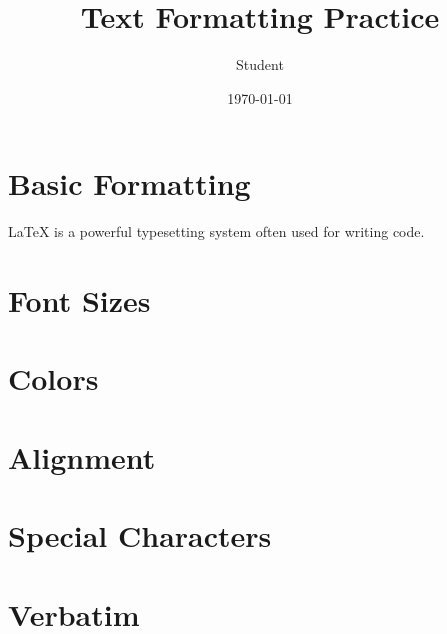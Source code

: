 \documentclass[12pt,a4paper]{article}
\title{Text Formatting Practice}
\author{Student}
\date{\today}
\begin{document}
\maketitle

\section{Basic Formatting}

LaTeX is a powerful typesetting system often used for writing code.

\section{Font Sizes}



\section{Colors}



\section{Alignment}



\section{Special Characters}



\section{Verbatim}

\end{document}
